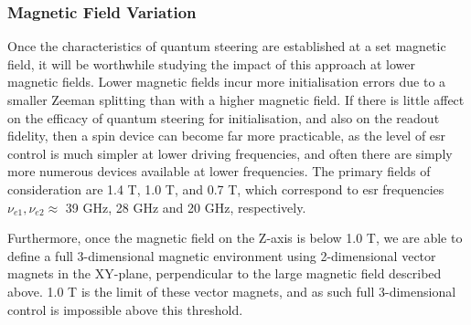 	\subsubsection{Magnetic Field Variation}
		Once the characteristics of quantum steering are established at a set magnetic field, it will be worthwhile studying the impact of this approach at lower magnetic fields. Lower magnetic fields incur more initialisation errors due to a smaller Zeeman splitting than with a higher magnetic field. If there is little affect on the efficacy of quantum steering for initialisation, and also on the readout fidelity, then a spin device can become far more practicable, as the level of \gls{esr} control is much simpler at lower driving frequencies, and often there are simply more numerous devices available at lower frequencies. The primary fields of consideration are 1.4 T, 1.0 T, and 0.7 T, which correspond to \gls{esr} frequencies  $\nu_{e1}, \nu_{e2} \approx$ 39 GHz, 28 GHz and 20 GHz, respectively.
		
		Furthermore, once the magnetic field on the Z-axis is below 1.0 T, we are able to define a full 3-dimensional magnetic environment using 2-dimensional vector magnets in the XY-plane, perpendicular to the large magnetic field described above. 1.0 T is the limit of these vector magnets, and as such full 3-dimensional control is impossible above this threshold.
		
	